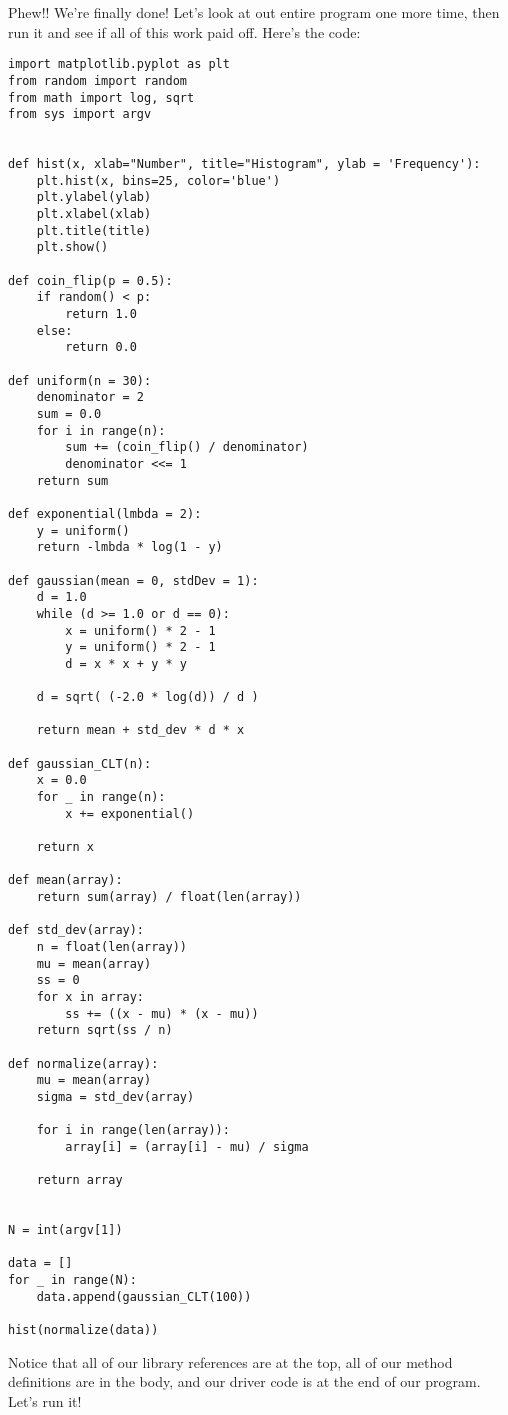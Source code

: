 \documentclass[a4paper]{article}
\begin{document}
Phew!! We're finally done! Let's look at out entire program one more time, then run it and see if all of this work paid off. Here's the code:
\scriptsize
\begin{verbatim}
import matplotlib.pyplot as plt
from random import random
from math import log, sqrt
from sys import argv


def hist(x, xlab="Number", title="Histogram", ylab = 'Frequency'):
    plt.hist(x, bins=25, color='blue')
    plt.ylabel(ylab)
    plt.xlabel(xlab)
    plt.title(title)
    plt.show()

def coin_flip(p = 0.5):
    if random() < p:
        return 1.0
    else:
        return 0.0

def uniform(n = 30):
    denominator = 2
    sum = 0.0
    for i in range(n):
        sum += (coin_flip() / denominator)
        denominator <<= 1
    return sum

def exponential(lmbda = 2):
    y = uniform()
    return -lmbda * log(1 - y)

def gaussian(mean = 0, stdDev = 1):
    d = 1.0
    while (d >= 1.0 or d == 0):
        x = uniform() * 2 - 1
        y = uniform() * 2 - 1
        d = x * x + y * y

    d = sqrt( (-2.0 * log(d)) / d )

    return mean + std_dev * d * x

def gaussian_CLT(n):
    x = 0.0
    for _ in range(n):
        x += exponential()

    return x

def mean(array):
    return sum(array) / float(len(array))

def std_dev(array):
    n = float(len(array))
    mu = mean(array)
    ss = 0
    for x in array:
        ss += ((x - mu) * (x - mu))
    return sqrt(ss / n)

def normalize(array):
    mu = mean(array)
    sigma = std_dev(array)

    for i in range(len(array)):
        array[i] = (array[i] - mu) / sigma

    return array


N = int(argv[1])

data = []
for _ in range(N):
    data.append(gaussian_CLT(100))

hist(normalize(data))
\end{verbatim}
\normalsize

Notice that all of our library references are at the top, all of our method definitions are in the body, and our driver code is at the end of our program. Let's run it!
\end{document}
